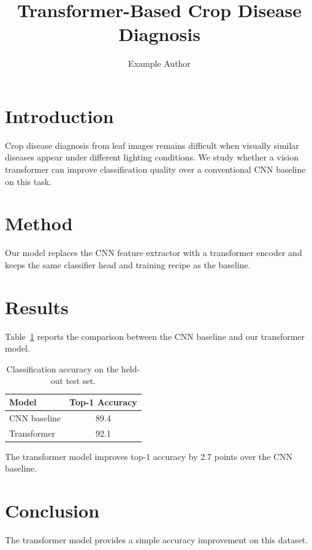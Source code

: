 \documentclass{article}
\title{Transformer-Based Crop Disease Diagnosis}
\author{Example Author}
\date{}
\begin{document}
\maketitle

\section{Introduction}
Crop disease diagnosis from leaf images remains difficult when visually similar diseases appear under different lighting conditions. We study whether a vision transformer can improve classification quality over a conventional CNN baseline on this task.

\section{Method}
Our model replaces the CNN feature extractor with a transformer encoder and keeps the same classifier head and training recipe as the baseline.

\section{Results}
Table~\ref{tab:main-results} reports the comparison between the CNN baseline and our transformer model.

\begin{table}[h]
\centering
\caption{Classification accuracy on the held-out test set.}
\label{tab:main-results}
\begin{tabular}{lc}
\toprule
Model & Top-1 Accuracy \\
\midrule
CNN baseline & 89.4 \\
Transformer & 92.1 \\
\bottomrule
\end{tabular}
\end{table}

The transformer model improves top-1 accuracy by 2.7 points over the CNN baseline.

\section{Conclusion}
The transformer model provides a simple accuracy improvement on this dataset.
\end{document}
